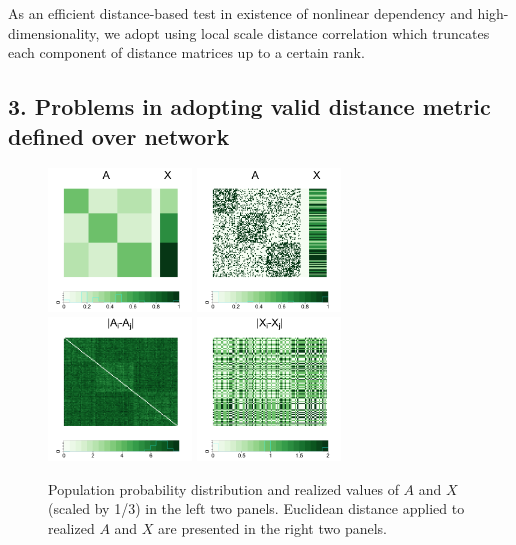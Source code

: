 \documentclass[12pt]{article}
\begin{document}
As an efficient distance-based test in existence of nonlinear dependency and high-dimensionality, we adopt using local scale distance correlation which truncates each component of distance matrices up to a certain rank.

\subsection*{3. Problems in adopting  valid distance metric defined over network}

\begin{figure}[H]
	\centering
	\includegraphics[width=1.5in]{../Figure/pmat.png}
	\includegraphics[width=1.5in]{../Figure/Amat.png}
	\includegraphics[width=1.5in]{../Figure/distA.png}
	\includegraphics[width=1.5in]{../Figure/distX.png}
	\caption{Population probability distribution and realized values of $A$ and $X$ (scaled by 1/3) in the left two panels. Euclidean distance applied to realized $A$ and $X$ are presented in the right two panels.}
	\label{fig:matrics}
\end{figure}	
  
\end{document}
